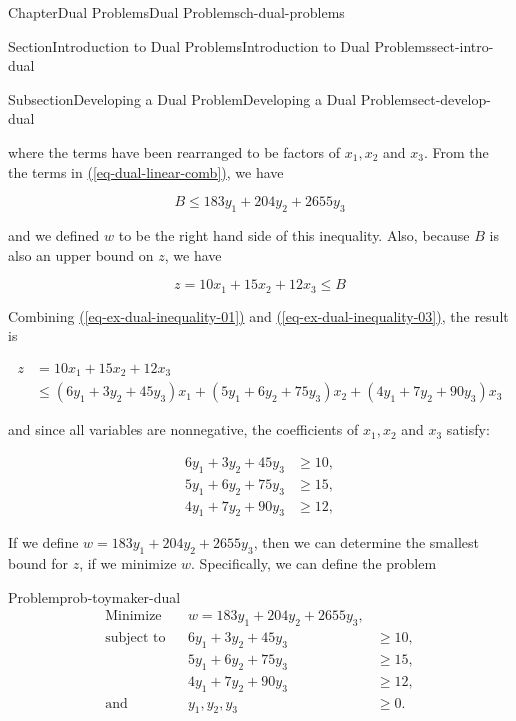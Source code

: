 \documentclass[oneside,10pt,]{book}
\newcommand{\xreffont}{\relax}
\numberwithin{equation}{section}
\newcommand{\amp}{&}
\begin{document}
\begin{chapterptx}{Chapter}{Dual Problems}{}{Dual Problems}{}{}{ch-dual-problems}
\begin{sectionptx}{Section}{Introduction to Dual Problems}{}{Introduction to Dual Problems}{}{}{sect-intro-dual}
\begin{subsectionptx}{Subsection}{Developing a Dual Problem}{}{Developing a Dual Problem}{}{}{sect-develop-dual}
%
\par
where the terms have been rearranged to be factors of \(x_1, x_2\) and \(x_3\).  From the the terms in \hyperref[eq-dual-linear-comb]{({\xreffont\ref{eq-dual-linear-comb}})}, we have%
\par
%
\begin{equation}
B \leq 183 y_1 + 204 y_2 + 2655 y_3\label{eq-ex-dual-inequality-02}
\end{equation}
%
\par
and we defined \(w\) to be the right hand side of this inequality.  Also, because \(B\) is also an upper bound on \(z\), we have%
\par
%
\begin{equation}
z = 10x_1 + 15x_2 + 12 x_3 \leq B \label{eq-ex-dual-inequality-03}
\end{equation}
%
\par
Combining \hyperref[eq-ex-dual-inequality-01]{({\xreffont\ref{eq-ex-dual-inequality-01}})} and \hyperref[eq-ex-dual-inequality-03]{({\xreffont\ref{eq-ex-dual-inequality-03}})}, the result is%
\par
%
\begin{equation*}
\begin{aligned} z \amp = 10 x_1 + 15 x_2 + 12 x_3 \\ \amp \leq (6y_1 + 3y_2 + 45y_3) x_1 + (5y_1 + 6y_2 + 75y_3) x_2 + (4y_1 + 7y_2 + 90 y_3) x_3 \end{aligned}
\end{equation*}
%
\par
and since all variables are nonnegative, the coefficients of \(x_1, x_2\) and \(x_3\) satisfy:%
\par
%
\begin{align*}
6y_1 + 3 y_2 + 45 y_3 \amp \geq 10, \\
5y_1 + 6y_2 + 75 y_3 \amp  \geq 15, \\
4y_1 + 7y_2 + 90 y_3 \amp \geq 12,
\end{align*}
%
\par
If we define \(w = 183 y_1 + 204 y_2 + 2655 y_3\), then we can determine the smallest bound for \(z\), if we minimize \(w\). Specifically, we can define the problem%
\begin{problem}{Problem}{}{prob-toymaker-dual}%
%
\begin{equation*}
\begin{aligned} \text{Minimize} \amp \amp w = 183 y_1 + 204 y_2 + 2655 y_3, \amp \\ \text{subject to} \amp \amp 6 y_1 + 3 y_2 + 45 y_3 \amp \geq 10, \\ \amp \amp 5 y_1 + 6 y_2 + 75 y_3 \amp \geq 15, \\ \amp \amp 4 y_1 + 7 y_2 + 90 y_3 \amp \geq 12, \\ \text{and} \amp \amp y_1, y_2, y_3 \amp \geq 0.

\end{aligned}
\end{equation*}
\end{problem}
\end{subsectionptx}
\end{sectionptx}
\end{chapterptx}
\end{document}
